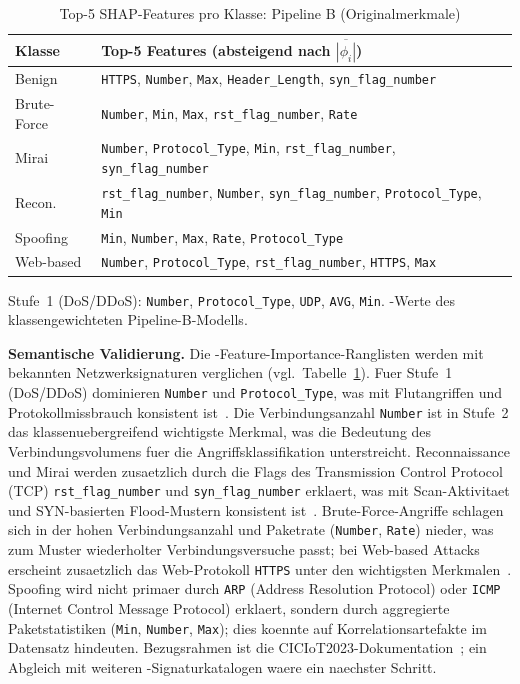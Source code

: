 \begin{table}[h]
\centering
\caption{Top-5 SHAP-Features pro Klasse: Pipeline B (Originalmerkmale)}
\label{tab:shap_top5}
\begin{tabular}{lp{}}
\toprule
Klasse & Top-5 Features (absteigend nach $\overline{|\phi_i|}$) \\
\midrule
Benign      & \texttt{HTTPS}, \texttt{Number}, \texttt{Max}, \texttt{Header\_Length}, \texttt{syn\_flag\_number} \\
Brute-Force & \texttt{Number}, \texttt{Min}, \texttt{Max}, \texttt{rst\_flag\_number}, \texttt{Rate} \\
Mirai       & \texttt{Number}, \texttt{Protocol\_Type}, \texttt{Min}, \texttt{rst\_flag\_number}, \texttt{syn\_flag\_number} \\
Recon.      & \texttt{rst\_flag\_number}, \texttt{Number}, \texttt{syn\_flag\_number}, \texttt{Protocol\_Type}, \texttt{Min} \\
Spoofing    & \texttt{Min}, \texttt{Number}, \texttt{Max}, \texttt{Rate}, \texttt{Protocol\_Type} \\
Web-based   & \texttt{Number}, \texttt{Protocol\_Type}, \texttt{rst\_flag\_number}, \texttt{HTTPS}, \texttt{Max} \\
\bottomrule
\end{tabular}
\smallskip\newline
{\footnotesize Stufe~1 (DoS/DDoS): \texttt{Number}, \texttt{Protocol\_Type}, \texttt{UDP}, \texttt{AVG}, \texttt{Min}.
\shap{}-Werte des klassengewichteten Pipeline-B-Modells.}
\end{table}

\textbf{Semantische Validierung.}
Die \shap{}-Feature-Importance-Ranglisten werden mit bekannten Netzwerksignaturen
verglichen (vgl.\ Tabelle~\ref{tab:shap_top5}).
Fuer Stufe~1 (DoS/DDoS) dominieren \texttt{Number} und \texttt{Protocol\_Type}, was mit
Flutangriffen und Protokollmissbrauch konsistent ist~\cite{neto2023ciciot2023}.
Die Verbindungsanzahl \texttt{Number} ist in Stufe~2 das klassenuebergreifend wichtigste
Merkmal, was die Bedeutung des Verbindungsvolumens fuer die Angriffsklassifikation
unterstreicht.
Reconnaissance und Mirai werden zusaetzlich durch die Flags des Transmission Control Protocol
(TCP) \texttt{rst\_flag\_number} und \texttt{syn\_flag\_number} erklaert, was mit Scan-Aktivitaet
und SYN-basierten Flood-Mustern konsistent ist~\cite{neto2023ciciot2023}.
Brute-Force-Angriffe schlagen sich in der hohen Verbindungsanzahl und Paketrate
(\texttt{Number}, \texttt{Rate}) nieder, was zum Muster wiederholter Verbindungsversuche passt;
bei Web-based Attacks erscheint zusaetzlich das Web-Protokoll \texttt{HTTPS} unter den
wichtigsten Merkmalen~\cite{neto2023ciciot2023}.
Spoofing wird nicht primaer durch \texttt{ARP} (Address Resolution Protocol) oder \texttt{ICMP}
(Internet Control Message Protocol) erklaert, sondern durch aggregierte Paketstatistiken
(\texttt{Min}, \texttt{Number}, \texttt{Max}); dies koennte auf Korrelationsartefakte im
Datensatz hindeuten.
Bezugsrahmen ist die CICIoT2023-Dokumentation~\cite{neto2023ciciot2023}; ein Abgleich mit
weiteren \ids{}-Signaturkatalogen waere ein naechster Schritt.

